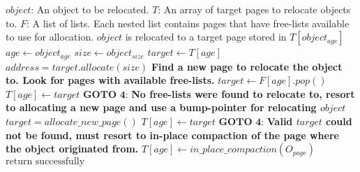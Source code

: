 \begin{algorithm}[H]
      \caption{$(O, T, F)$}
      \label{alg:use}
      \begin{algorithmic}[1]
                \Require 
                \Statex $object$: An object to be relocated.
                \Statex $T$: An array of target pages to relocate objects to.
                \Statex $F$: A list of lists. Each nested list contains pages that have free-lists available to use for allocation.
                \Ensure 
                \Statex $object$ is relocated to a target page stored in $T[object_{age}]$ 
                \State $age \gets object_{age}$
                \State $size \gets object_{size}$
                \State $target \gets T[age]$
                \State $address = target.allocate(size)$
                 
                      \Statex \textbf{Find a new page to relocate the object to. Look for pages with available free-lists.}
                      \State $target \gets F[age].pop()$
                              \State $T[age] \gets target$
                              \State $\textbf{GOTO 4:}$
                      \EndIf
                      \Statex \textbf{No free-lists were found to relocate to, resort to allocating a new page and use a bump-pointer for relocating $object$}
                      \State $target = allocate\_new\_page()$ 
                              \State $T[age] \gets target$
                              \State $\textbf{GOTO 4:}$
                      \EndIf
                      \Statex \textbf{Valid $target$ could not be found, must resort to in-place compaction of the page where the object originated from.}
                      \State $T[age] \gets in\_place\_compaction(O_{page})$
                \EndIf
                \State $\text{return successfully}$
      \end{algorithmic}
\end{algorithm}


